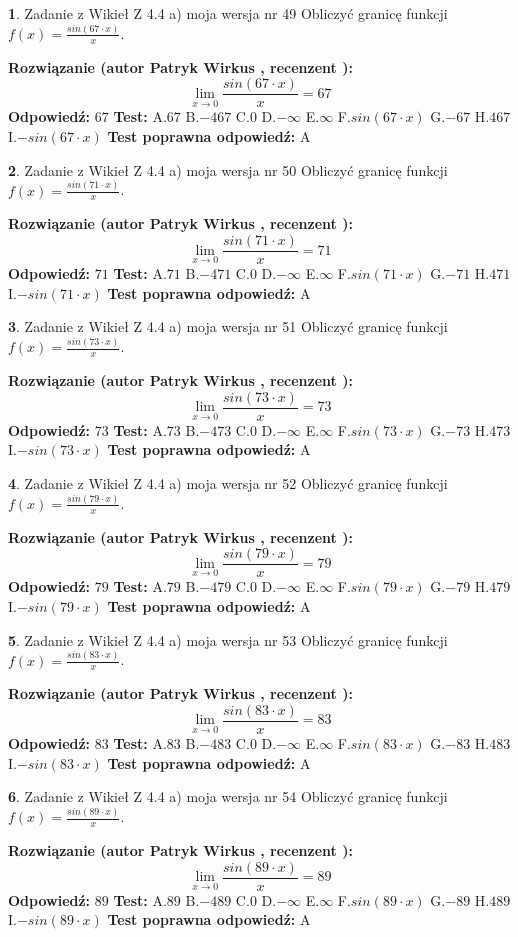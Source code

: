 \documentclass[12pt, a4paper]{article}
\theoremstyle{definition} %
\newtheorem{zad}{}
\newcommand{\zadStart}[1]{\begin{zad}#1\newline}
\newcommand{\zadStop}{\end{zad}}
\newcommand{\rozwStart}[2]{\noindent \textbf{Rozwiązanie (autor #1 , recenzent #2): }\newline}
\newcommand{\rozwStop}{\newline}
\newcommand{\odpStart}{\noindent \textbf{Odpowiedź:}\newline}
\newcommand{\odpStop}{\newline}
\newcommand{\testStart}{\noindent \textbf{Test:}\newline}
\newcommand{\testStop}{\newline}
\newcommand{\kluczStart}{\noindent \textbf{Test poprawna odpowiedź:}\newline}
\newcommand{\kluczStop}{\newline}
\begin{document}
\zadStart{Zadanie z Wikieł Z 4.4 a) moja wersja nr 49}
Obliczyć granicę funkcji $f(x)=\frac{sin(67\cdot x)}{x}$.
\zadStop
\rozwStart{Patryk Wirkus}{}
$$\lim\limits_{x\to 0}\frac{sin(67\cdot x)}{x}=
67$$
\rozwStop
\odpStart
$67$
\odpStop
\testStart
A.$67$
B.$-467$
C.$0$
D.$-\infty$
E.$\infty$
F.$sin(67\cdot x)$
G.$-67$
H.$467$
I.$-sin(67\cdot x)$
\testStop
\kluczStart
A
\kluczStop



\zadStart{Zadanie z Wikieł Z 4.4 a) moja wersja nr 50}
Obliczyć granicę funkcji $f(x)=\frac{sin(71\cdot x)}{x}$.
\zadStop
\rozwStart{Patryk Wirkus}{}
$$\lim\limits_{x\to 0}\frac{sin(71\cdot x)}{x}=
71$$
\rozwStop
\odpStart
$71$
\odpStop
\testStart
A.$71$
B.$-471$
C.$0$
D.$-\infty$
E.$\infty$
F.$sin(71\cdot x)$
G.$-71$
H.$471$
I.$-sin(71\cdot x)$
\testStop
\kluczStart
A
\kluczStop



\zadStart{Zadanie z Wikieł Z 4.4 a) moja wersja nr 51}
Obliczyć granicę funkcji $f(x)=\frac{sin(73\cdot x)}{x}$.
\zadStop
\rozwStart{Patryk Wirkus}{}
$$\lim\limits_{x\to 0}\frac{sin(73\cdot x)}{x}=
73$$
\rozwStop
\odpStart
$73$
\odpStop
\testStart
A.$73$
B.$-473$
C.$0$
D.$-\infty$
E.$\infty$
F.$sin(73\cdot x)$
G.$-73$
H.$473$
I.$-sin(73\cdot x)$
\testStop
\kluczStart
A
\kluczStop



\zadStart{Zadanie z Wikieł Z 4.4 a) moja wersja nr 52}
Obliczyć granicę funkcji $f(x)=\frac{sin(79\cdot x)}{x}$.
\zadStop
\rozwStart{Patryk Wirkus}{}
$$\lim\limits_{x\to 0}\frac{sin(79\cdot x)}{x}=
79$$
\rozwStop
\odpStart
$79$
\odpStop
\testStart
A.$79$
B.$-479$
C.$0$
D.$-\infty$
E.$\infty$
F.$sin(79\cdot x)$
G.$-79$
H.$479$
I.$-sin(79\cdot x)$
\testStop
\kluczStart
A
\kluczStop



\zadStart{Zadanie z Wikieł Z 4.4 a) moja wersja nr 53}
Obliczyć granicę funkcji $f(x)=\frac{sin(83\cdot x)}{x}$.
\zadStop
\rozwStart{Patryk Wirkus}{}
$$\lim\limits_{x\to 0}\frac{sin(83\cdot x)}{x}=
83$$
\rozwStop
\odpStart
$83$
\odpStop
\testStart
A.$83$
B.$-483$
C.$0$
D.$-\infty$
E.$\infty$
F.$sin(83\cdot x)$
G.$-83$
H.$483$
I.$-sin(83\cdot x)$
\testStop
\kluczStart
A
\kluczStop



\zadStart{Zadanie z Wikieł Z 4.4 a) moja wersja nr 54}
Obliczyć granicę funkcji $f(x)=\frac{sin(89\cdot x)}{x}$.
\zadStop
\rozwStart{Patryk Wirkus}{}
$$\lim\limits_{x\to 0}\frac{sin(89\cdot x)}{x}=
89$$
\rozwStop
\odpStart
$89$
\odpStop
\testStart
A.$89$
B.$-489$
C.$0$
D.$-\infty$
E.$\infty$
F.$sin(89\cdot x)$
G.$-89$
H.$489$
I.$-sin(89\cdot x)$
\testStop
\kluczStart
A
\kluczStop
\end{document}
